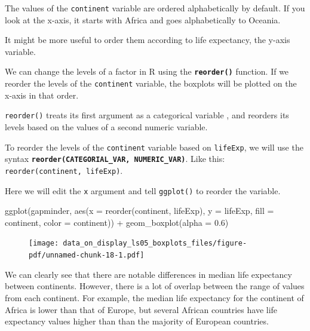 \documentclass[
  letterpaper,
  DIV=11,
  numbers=noendperiod]{scrreprt}
\newenvironment{Shaded}{\begin{snugshade}}{\end{snugshade}}
\newcommand{\AttributeTok}[1]{\textcolor[rgb]{0.40,0.45,0.13}{#1}}
\newcommand{\FloatTok}[1]{\textcolor[rgb]{0.68,0.00,0.00}{#1}}
\newcommand{\FunctionTok}[1]{\textcolor[rgb]{0.28,0.35,0.67}{#1}}
\newcommand{\NormalTok}[1]{\textcolor[rgb]{0.00,0.23,0.31}{#1}}
\newcommand{\SpecialCharTok}[1]{\textcolor[rgb]{0.37,0.37,0.37}{#1}}
\begin{document}
The values of the \texttt{continent} variable are ordered alphabetically
by default. If you look at the x-axis, it starts with Africa and goes
alphabetically to Oceania.

It might be more useful to order them according to life expectancy, the
y-axis variable.

We can change the levels of a factor in R using the
\textbf{\texttt{reorder()}} function. If we reorder the levels of the
\texttt{continent} variable, the boxplots will be plotted on the x-axis
in that order.

\texttt{reorder()} treats its first argument as a categorical variable ,
and reorders its levels based on the values of a second numeric
variable.

To reorder the levels of the \texttt{continent} variable based on
\texttt{lifeExp}, we will use the syntax
\textbf{\texttt{reorder(CATEGORIAL\_VAR,\ NUMERIC\_VAR)}}. Like this:
\texttt{reorder(continent,\ lifeExp)}.

Here we will edit the \texttt{x} argument and tell \texttt{ggplot()} to
reorder the variable.

\begin{Shaded}
\begin{Highlighting}[]
\FunctionTok{ggplot}\NormalTok{(gapminder, }
       \FunctionTok{aes}\NormalTok{(}\AttributeTok{x =} \FunctionTok{reorder}\NormalTok{(continent, lifeExp),}
           \AttributeTok{y =}\NormalTok{ lifeExp, }
           \AttributeTok{fill =}\NormalTok{ continent,}
           \AttributeTok{color =}\NormalTok{ continent)) }\SpecialCharTok{+}
  \FunctionTok{geom\_boxplot}\NormalTok{(}\AttributeTok{alpha =} \FloatTok{0.6}\NormalTok{)}
\end{Highlighting}
\end{Shaded}

\begin{figure}[H]

{\centering \texttt{[image: data\_on\_display\_ls05\_boxplots\_files/figure-pdf/unnamed-chunk-18-1.pdf]}

}

\end{figure}

We can clearly see that there are notable differences in median life
expectancy between continents. However, there is a lot of overlap
between the range of values from each continent. For example, the median
life expectancy for the continent of Africa is lower than that of
Europe, but several African countries have life expectancy values higher
than than the majority of European countries.
\end{document}
